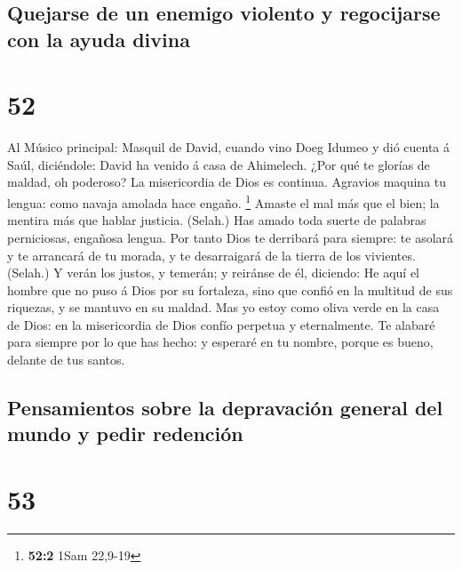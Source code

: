 \hypertarget{quejarse-de-un-enemigo-violento-y-regocijarse-con-la-ayuda-divina}{%
\subsection{Quejarse de un enemigo violento y regocijarse con la ayuda
divina}\label{quejarse-de-un-enemigo-violento-y-regocijarse-con-la-ayuda-divina}}

\hypertarget{section-51}{%
\section{52}\label{section-51}}

 Al Músico principal: Masquil de David, cuando vino Doeg
Idumeo y dió cuenta á Saúl, diciéndole: David ha venido á casa de
Ahimelech. ¿Por qué te glorías de maldad, oh poderoso? La misericordia
de Dios es continua.  Agravios maquina tu lengua: como
navaja amolada hace engaño. \footnote{\textbf{52:2} 1Sam 22,9-19}
 Amaste el mal más que el bien; la mentira más que hablar
justicia. (Selah.)  Has amado toda suerte de palabras
perniciosas, engañosa lengua.  Por tanto Dios te derribará
para siempre: te asolará y te arrancará de tu morada, y te desarraigará
de la tierra de los vivientes. (Selah.)  Y verán los justos,
y temerán; y reiránse de él, diciendo:  He aquí el hombre
que no puso á Dios por su fortaleza, sino que confió en la multitud de
sus riquezas, y se mantuvo en su maldad.  Mas yo estoy como
oliva verde en la casa de Dios: en la misericordia de Dios confío
perpetua y eternalmente.  Te alabaré para siempre por lo que
has hecho: y esperaré en tu nombre, porque es bueno, delante de tus
santos.

\hypertarget{pensamientos-sobre-la-depravaciuxf3n-general-del-mundo-y-pedir-redenciuxf3n-1}{%
\subsection{Pensamientos sobre la depravación general del mundo y pedir
redención}\label{pensamientos-sobre-la-depravaciuxf3n-general-del-mundo-y-pedir-redenciuxf3n-1}}

\hypertarget{section-52}{%
\section{53}\label{section-52}}

